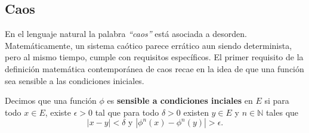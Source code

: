 \documentclass[../Main.tex]{subfiles}
\begin{document}
\subsection{Caos}
    En el lenguaje natural la palabra \textit{``caos''} está asociada a desorden. Matemáticamente, un sistema caótico parece errático aun siendo determinista, pero al mismo tiempo, cumple con requisitos específicos. El primer requisito de la definición matemática contemporánea de caos recae en la idea de que una función sea sensible a las condiciones iniciales.
\begin{definition}{}{}
    Decimos que una función $\phi$ es \textbf{sensible a condiciones inciales} en $E$ si para todo $x\in E$, existe $\epsilon >0$ tal que para todo $\delta >0$ existen $y\in E$ y $n\in \mathbb{N}$ tales que \[|x-y|<\delta \text{ y }|\phi^n(x)-\phi^n(y)|>\epsilon.\]
\end{definition}

\end{document}
